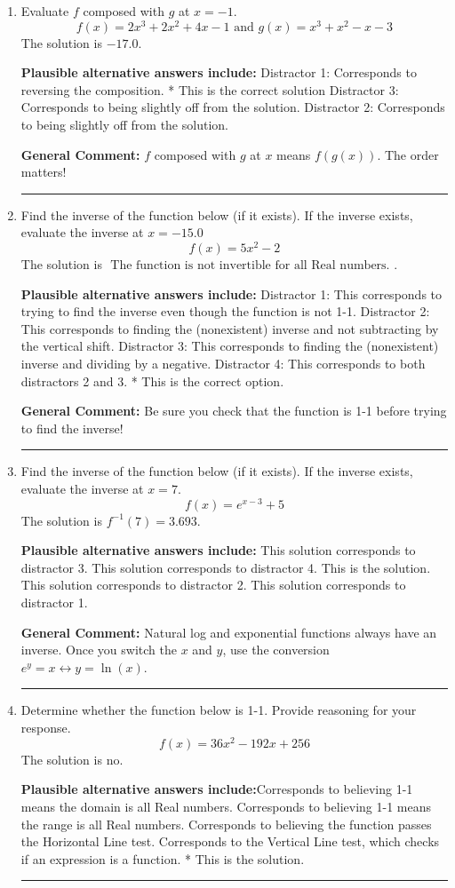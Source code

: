 \documentclass{extbook}[14pt]
\newcommand{\litem}[1]{\item #1

\rule{\textwidth}{0.4pt}}
\begin{document}
\begin{enumerate}\litem{
Evaluate $f$ composed with $g$ at $x=-1$.
\[ f(x) = 2x^{3} +2 x^{2} +4 x -1 \text{ and } g(x) = x^{3} + x^{2} -x -3 \]The solution is \( -17.0 \).\begin{enumerate}[label=\Alph*.]
\textbf{Plausible alternative answers include:} Distractor 1: Corresponds to reversing the composition.
* This is the correct solution
 Distractor 3: Corresponds to being slightly off from the solution.
 Distractor 2: Corresponds to being slightly off from the solution.

\end{enumerate}

\textbf{General Comment:} $f$ composed with $g$ at $x$ means $f(g(x))$. The order matters!
}
\litem{
Find the inverse of the function below (if it exists). If the inverse exists, evaluate the inverse at $x = -15.0$
\[ f(x) = 5 x^2 - 2 \]The solution is \( \text{ The function is not invertible for all Real numbers. } \).\begin{enumerate}[label=\Alph*.]
\textbf{Plausible alternative answers include:} Distractor 1: This corresponds to trying to find the inverse even though the function is not 1-1. 
 Distractor 2: This corresponds to finding the (nonexistent) inverse and not subtracting by the vertical shift.
 Distractor 3: This corresponds to finding the (nonexistent) inverse and dividing by a negative.
 Distractor 4: This corresponds to both distractors 2 and 3.
* This is the correct option.
\end{enumerate}

\textbf{General Comment:} Be sure you check that the function is 1-1 before trying to find the inverse!
}
\litem{
Find the inverse of the function below (if it exists). If the inverse exists, evaluate the inverse at $x = 7$.
\[ f(x) = e^{x-3}+5 \]The solution is \( f^{-1}(7) = 3.693 \).\begin{enumerate}[label=\Alph*.]
\textbf{Plausible alternative answers include:} This solution corresponds to distractor 3.
 This solution corresponds to distractor 4.
 This is the solution.
 This solution corresponds to distractor 2.
 This solution corresponds to distractor 1.
\end{enumerate}

\textbf{General Comment:} Natural log and exponential functions always have an inverse. Once you switch the $x$ and $y$, use the conversion $ e^y = x \leftrightarrow y=\ln(x)$.
}
\litem{
Determine whether the function below is 1-1. Provide reasoning for your response.
\[ f(x) = 36 x^2 - 192 x + 256 \]The solution is \( \text{no} \).\begin{enumerate}[label=\Alph*.]
\textbf{Plausible alternative answers include:}Corresponds to believing 1-1 means the domain is all Real numbers.
Corresponds to believing 1-1 means the range is all Real numbers.
Corresponds to believing the function passes the Horizontal Line test.
Corresponds to the Vertical Line test, which checks if an expression is a function.
* This is the solution.
\end{enumerate}

}
\end{enumerate}
\end{document}
